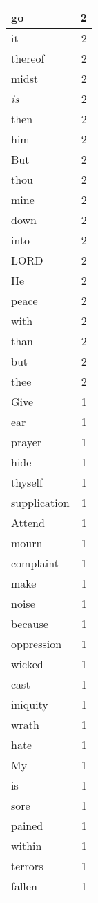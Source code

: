 \begin{center}
\begin{longtable}{l|r}
go & 2 \\ \hline
it & 2 \\ \hline
thereof & 2 \\ \hline
midst & 2 \\ \hline
\emph{is} & 2 \\ \hline
then & 2 \\ \hline
him & 2 \\ \hline
But & 2 \\ \hline
thou & 2 \\ \hline
mine & 2 \\ \hline
down & 2 \\ \hline
into & 2 \\ \hline
LORD & 2 \\ \hline
He & 2 \\ \hline
peace & 2 \\ \hline
with & 2 \\ \hline
than & 2 \\ \hline
but & 2 \\ \hline
thee & 2 \\ \hline
Give & 1 \\ \hline
ear & 1 \\ \hline
prayer & 1 \\ \hline
hide & 1 \\ \hline
thyself & 1 \\ \hline
supplication & 1 \\ \hline
Attend & 1 \\ \hline
mourn & 1 \\ \hline
complaint & 1 \\ \hline
make & 1 \\ \hline
noise & 1 \\ \hline
because & 1 \\ \hline
oppression & 1 \\ \hline
wicked & 1 \\ \hline
cast & 1 \\ \hline
iniquity & 1 \\ \hline
wrath & 1 \\ \hline
hate & 1 \\ \hline
My & 1 \\ \hline
is & 1 \\ \hline
sore & 1 \\ \hline
pained & 1 \\ \hline
within & 1 \\ \hline
terrors & 1 \\ \hline
fallen & 1 \\ \hline

\end{longtable}
\end{center}
